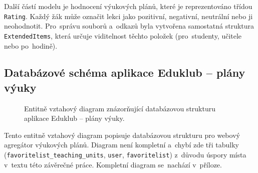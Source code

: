 \documentclass[male,czech,api_bc]{kitheses}
\begin{document}
Další částí modelu je hodnocení výukových plánů, které je reprezentováno třídou \texttt{Rating}. Každý žák může označit lekci jako pozitivní, negativní, neutrální nebo ji neohodnotit. Pro~správu souborů a~odkazů byla vytvořena samostatná struktura \texttt{ExtendedItems}, která určuje viditelnost těchto položek (pro~studenty, učitele nebo po~hodině).

\subsection{Databázové schéma aplikace Eduklub – plány výuky}

\begin{figure}[H]
	\centering
	\caption{Entitně vztahový diagram znázorňující databázovou strukturu aplikace Eduklub – plány výuky.}
	\label{fig:erd-2}
\end{figure}

Tento entitně vztahový diagram popisuje databázovou strukturu pro webový agregátor výukových plánů. Diagram není kompletní a~chybí zde tři tabulky (\texttt{favoritelist\_teaching\_units}, \texttt{user}, \texttt{favoritelist}) z~důvodu úspory místa v~textu této závěrečné práce. Kompletní diagram se~nachází v~příloze.
\end{document}
